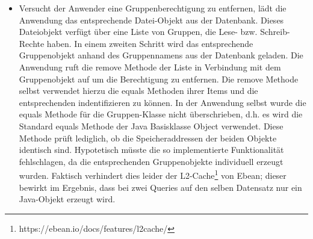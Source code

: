 \documentclass[12pt,DIV14,BCOR10mm,a4paper,parskip=half-,headsepline,headinclude,english,ngerman,bibliography=totocnumbered]{scrreprt}
\begin{document}
\begin{itemize}
  \item Versucht der Anwender eine Gruppenberechtigung zu entfernen, lädt die Anwendung das entsprechende Datei-Objekt aus der Datenbank. Dieses Dateiobjekt verfügt über eine Liste von Gruppen, die Lese- bzw. Schreib-Rechte haben. In einem zweiten Schritt wird das entsprechende Gruppenobjekt anhand des Gruppennamens aus der Datenbank geladen. Die Anwendung ruft die remove Methode der Liste in Verbindung mit dem Gruppenobjekt auf um die Berechtigung zu entfernen. Die remove Methode selbst verwendet hierzu die equals Methoden ihrer Items und die entsprechenden indentifizieren zu können. In der Anwendung selbst wurde die equals Methode für die Gruppen-Klasse nicht überschrieben, d.h. es wird die Standard equals Methode der Java Basisklasse Object verwendet. Diese Methode prüft lediglich, ob die Speicheraddressen der beiden Objekte identisch sind. Hypotetisch müsste die so implementierte Funktionalität fehlschlagen, da die entsprechenden Gruppenobjekte individuell erzeugt wurden. Faktisch verhindert dies leider der L2-Cache\footnote{https://ebean.io/docs/features/l2cache/} von Ebean; dieser bewirkt im Ergebnis, dass bei zwei Queries auf den selben Datensatz nur ein Java-Objekt erzeugt wird.
  
\end{itemize}

\printbibliography

\printacronyms[title=Abkürzungsverzeichnis,toctitle=Abkürzungsverzeichnis]
\printglossary[title=Glossar,toctitle=Glossar,type=main]

\iftotalfigures
  \listoffigures
\fi

\end{document}
